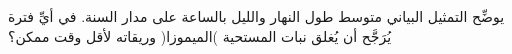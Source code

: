 
\begin{question}

\begin{instance}

\begin{mcq}[standalone=false]

\begin{stem}
يوضِّح التمثيل البياني متوسط طول النهار والليل بالساعة على مدار السنة. في أيِّ فترة يُرَجَّح أن يُغلق نبات المستحية )الميموزا(  وريقاته لأقل وقت ممكن؟\par
{}
\end{stem}

\begin{distractors}
        
\end{distractors}

\end{mcq}

\end{instance}

\end{question}
